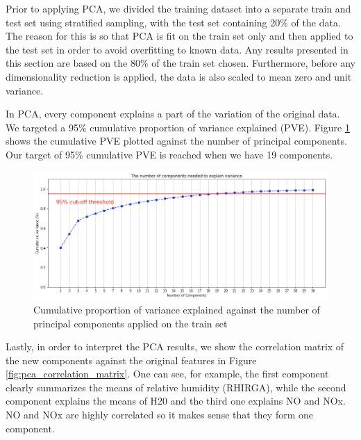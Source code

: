 Prior to applying PCA, we divided the training dataset into a separate train and test set using stratified sampling, with the test set containing 20\% of the data. The reason for this is so that PCA is fit on the train set only and then applied to the test set in order to avoid overfitting to known data. Any results presented in this section are based on the 80\% of the train set chosen. Furthermore, before any dimensionality reduction is applied, the data is also scaled to mean zero and unit variance.

In PCA, every component explains a part of the variation of the original data. We targeted a 95\% cumulative proportion of variance explained (PVE). Figure \ref{fig:pve} shows the cumulative PVE plotted against the number of principal components. Our target of 95\% cumulative PVE is reached when we have 19 components.

\begin{figure}
   \centering
   \includegraphics[width=\textwidth]{images/cumulative_pve.png}
   \caption{Cumulative proportion of variance explained against the number of principal components applied on the train set}
   \label{fig:pve}
\end{figure}

Lastly, in order to interpret the PCA results, we show the correlation matrix of the new components against the original features in Figure \ref{fig:pca_correlation_matrix}. One can see, for example, the first component clearly summarizes the means of relative humidity (RHIRGA), while the second component explains the means of H20 and the third one explains NO and NOx. NO and NOx are highly correlated so it makes sense that they form one component.

